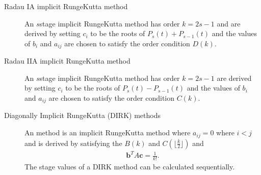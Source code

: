 \documentclass[letterpaper,10pt,english]{jupyterBook}
\begin{document}
\begin{description}
\item[{Radau IA implicit Runge\sphinxhyphen{}Kutta method\label{\detokenize{8_Appendices/8.0_Cheat_sheet:term-Radau-IA-implicit-Runge-Kutta-method}}}] \leavevmode
\sphinxAtStartPar
An \(s\)\sphinxhyphen{}stage {\hyperref[\detokenize{3_IRKs/3.1_Deriving_IRK_methods:radau-derivation}]{}} implicit Runge\sphinxhyphen{}Kutta method has order \(k = 2s - 1\) and are derived by setting \(c_i\) to be the roots of \(P_s(t) + P_{s-1}(t)\) and the values of \(b_i\) and \(a_{ij}\) are chosen to satisfy the order condition \(D(k)\).

\item[{Radau IIA implicit Runge\sphinxhyphen{}Kutta method \label{\detokenize{8_Appendices/8.0_Cheat_sheet:term-Radau-IIA-implicit-Runge-Kutta-method}}}] \leavevmode
\sphinxAtStartPar
An \(s\)\sphinxhyphen{}stage {\hyperref[\detokenize{3_IRKs/3.1_Deriving_IRK_methods:radau-derivation}]{}} implicit Runge\sphinxhyphen{}Kutta method has order \(k = 2s - 1\)  are derived by setting \(c_i\) to be the roots of \(P_s(t) - P_{s-1}(t)\) and the values of \(b_i\) and \(a_{ij}\) are chosen to satisfy the order condition \(C(k)\).

\item[{Diagonally Implicit Runge\sphinxhyphen{}Kutta (DIRK) methods\label{\detokenize{8_Appendices/8.0_Cheat_sheet:term-Diagonally-Implicit-Runge-Kutta-DIRK-methods}}}] \leavevmode
\sphinxAtStartPar
An {\hyperref[\detokenize{3_IRKs/3.1_Deriving_IRK_methods:dirk-derivation}]{}} method is an implicit Runge\sphinxhyphen{}Kutta method where \(a_{ij} = 0\) where \(i < j\) and is derived by satisfying the \(B(k)\) and \(C(\lfloor \frac{k}{2} \rfloor)\) and
\begin{equation*}
\begin{split}\mathbf{b}^T A \mathbf{c} = \frac{1}{k!}.\end{split}
\end{equation*}
\sphinxAtStartPar
The stage values of a DIRK method can be calculated sequentially.


\end{description}
\end{document}
